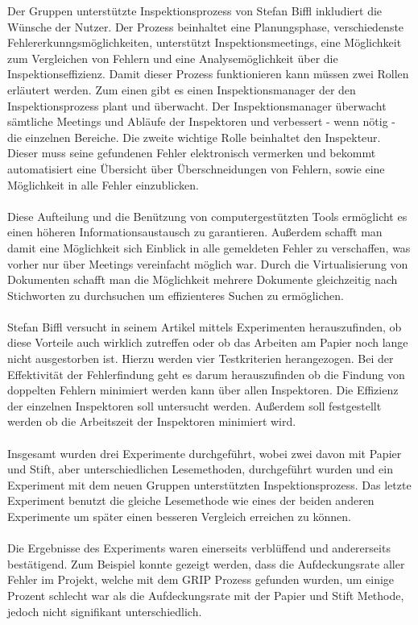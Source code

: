\documentclass{llncs}
\begin{document}
Der Gruppen unterstützte Inspektionsprozess von Stefan Biffl inkludiert die Wünsche der Nutzer. Der Prozess beinhaltet eine Planungsphase, verschiedenste Fehlererkunngsmöglichkeiten, unterstützt Inspektionsmeetings, eine Möglichkeit zum Vergleichen von Fehlern und eine Analysemöglichkeit über die Inspektionseffizienz. Damit dieser Prozess funktionieren kann müssen zwei Rollen erläutert werden. Zum einen gibt es einen Inspektionsmanager der den Inspektionsprozess plant und überwacht. Der Inspektionsmanager überwacht sämtliche Meetings und Abläufe der Inspektoren und verbessert - wenn nötig - die einzelnen Bereiche. Die zweite wichtige Rolle beinhaltet den Inspekteur. Dieser muss seine gefundenen Fehler elektronisch vermerken und bekommt automatisiert eine Übersicht über Überschneidungen von Fehlern, sowie eine Möglichkeit in alle Fehler einzublicken.
\\ \\
Diese Aufteilung und die Benützung von computergestützten Tools ermöglicht es einen höheren Informationsaustausch zu garantieren. Außerdem schafft man damit eine Möglichkeit sich Einblick in alle gemeldeten Fehler zu verschaffen, was vorher nur über Meetings vereinfacht möglich war. Durch die Virtualisierung von Dokumenten schafft man die Möglichkeit mehrere Dokumente gleichzeitig nach Stichworten zu durchsuchen um effizienteres Suchen zu ermöglichen.
\\ \\
Stefan Biffl versucht in seinem Artikel mittels Experimenten herauszufinden, ob diese Vorteile auch wirklich zutreffen oder ob das Arbeiten am Papier noch lange nicht ausgestorben ist. Hierzu werden vier Testkriterien herangezogen. 
Bei der Effektivität der Fehlerfindung geht es darum herauszufinden ob die Findung von doppelten Fehlern minimiert werden kann über allen Inspektoren. Die Effizienz der einzelnen Inspektoren soll untersucht werden. Außerdem soll festgestellt werden ob die Arbeitszeit der Inspektoren minimiert wird. 
\\ \\
Insgesamt wurden drei Experimente durchgeführt, wobei zwei davon mit Papier und Stift, aber unterschiedlichen Lesemethoden, durchgeführt wurden und ein Experiment mit dem neuen Gruppen unterstützten Inspektionsprozess. Das letzte Experiment benutzt die gleiche Lesemethode wie eines der beiden anderen Experimente um später einen besseren Vergleich erreichen zu können. 
\\ \\
Die Ergebnisse des Experiments waren einerseits verblüffend und andererseits bestätigend. Zum Beispiel konnte gezeigt werden, dass die Aufdeckungsrate aller Fehler im Projekt, welche mit dem GRIP Prozess gefunden wurden, um einige Prozent schlecht war als die Aufdeckungsrate mit der Papier und Stift Methode, jedoch nicht signifikant unterschiedlich. 
\end{document}
